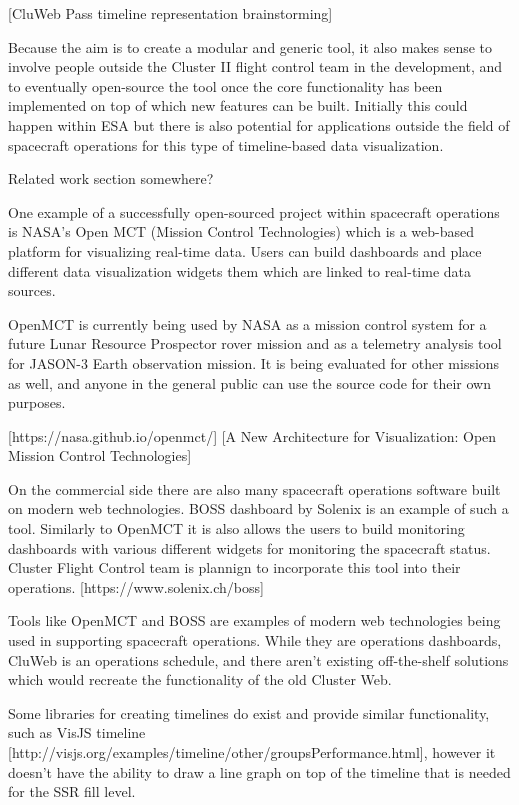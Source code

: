[CluWeb Pass timeline representation brainstorming]

Because the aim is to create a modular and generic tool, it also makes sense to involve people outside the Cluster II flight control team in the development, and to eventually open-source the tool once the core functionality has been implemented on top of which new features can be built. Initially this could happen within ESA but there is also potential for applications outside the field of spacecraft operations for this type of timeline-based data visualization.

Related work section somewhere?

One example of a successfully open-sourced project within spacecraft operations is NASA's Open MCT (Mission Control Technologies) which is a web-based platform for visualizing real-time data. Users can build dashboards and place different data visualization widgets them which are linked to real-time data sources.

OpenMCT is currently being used by NASA as a mission control system for a future Lunar Resource Prospector rover mission and as a telemetry analysis tool for JASON-3 Earth observation mission. It is being evaluated for other missions as well, and anyone in the general public can use the source code for their own purposes.

[https://nasa.github.io/openmct/]
[A New Architecture for
Visualization: Open Mission
Control Technologies]

On the commercial side there are also many spacecraft operations software built on modern web technologies. BOSS dashboard by Solenix is an example of such a tool. Similarly to OpenMCT it is also allows the users to build monitoring dashboards with various different widgets for monitoring the spacecraft status. Cluster Flight Control team is plannign to incorporate this tool into their operations.
[https://www.solenix.ch/boss]

Tools like OpenMCT and BOSS are examples of modern web technologies being used in supporting spacecraft operations. While they are operations dashboards, CluWeb is an operations schedule, and there aren't existing off-the-shelf solutions which would recreate the functionality of the old Cluster Web. 

Some libraries for creating timelines do exist and provide similar functionality, such as VisJS timeline [http://visjs.org/examples/timeline/other/groupsPerformance.html], however it doesn't have the ability to draw a line graph on top of the timeline that is needed for the SSR fill level.


